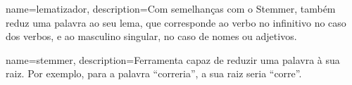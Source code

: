 


 { 
  name=lematizador,
  description={Com semelhanças com o Stemmer, também reduz uma palavra ao seu lema, que corresponde ao verbo no infinitivo no caso dos verbos, e ao masculino singular, no caso de nomes ou adjetivos. }
 }
 
{
  name=stemmer,
  description={Ferramenta capaz de reduzir uma palavra à sua raiz. Por exemplo, para a palavra ``correria'', a sua raiz seria ``corre''. }
 }
 
